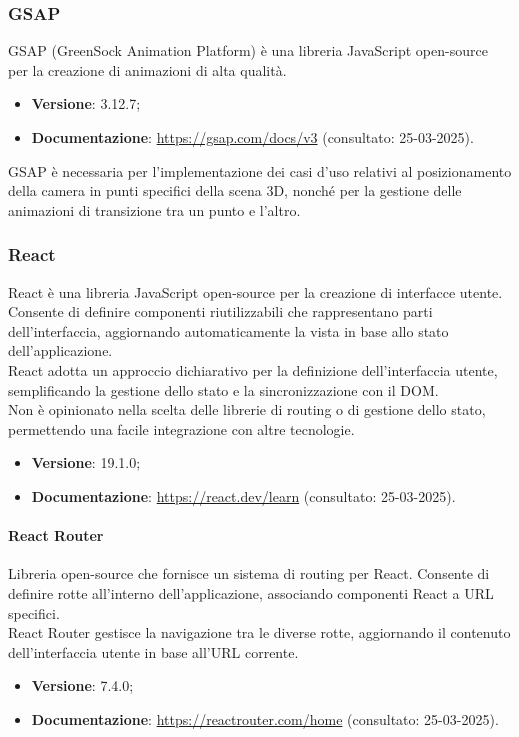 \subsubsection{GSAP}
GSAP (GreenSock Animation Platform) è una libreria JavaScript open-source per
la creazione di animazioni di alta qualità.
\begin{itemize}
    \item \textbf{Versione}: 3.12.7;
    \item \textbf{Documentazione}: \url{https://gsap.com/docs/v3} (consultato:
          25-03-2025).
\end{itemize}
GSAP è necessaria per l'implementazione dei casi d'uso relativi al posizionamento
della camera in punti specifici della scena 3D, nonché per la gestione delle
animazioni di transizione tra un punto e l'altro.

\subsubsection{React}
React è una libreria JavaScript open-source per la creazione di interfacce
utente. Consente di definire componenti riutilizzabili che rappresentano parti
dell'interfaccia, aggiornando automaticamente la vista in base allo stato
dell'applicazione. \\React adotta un approccio dichiarativo per la definizione
dell'interfaccia utente, semplificando la gestione dello stato e la
sincronizzazione con il DOM. \\Non è opinionato nella scelta delle librerie di
routing o di gestione dello stato, permettendo una facile integrazione con
altre tecnologie.
\begin{itemize}
    \item \textbf{Versione}: 19.1.0;
    \item \textbf{Documentazione}: \url{https://react.dev/learn} (consultato:
          25-03-2025).
\end{itemize}

\paragraph{React Router}
Libreria open-source che fornisce un sistema di routing per React. Consente di
definire rotte all'interno dell'applicazione, associando componenti React a URL
specifici. \\React Router gestisce la navigazione tra le diverse rotte,
aggiornando il contenuto dell'interfaccia utente in base all'URL corrente.
\begin{itemize}
    \item \textbf{Versione}: 7.4.0;
    \item \textbf{Documentazione}: \url{https://reactrouter.com/home} (consultato:
          25-03-2025).
\end{itemize}


